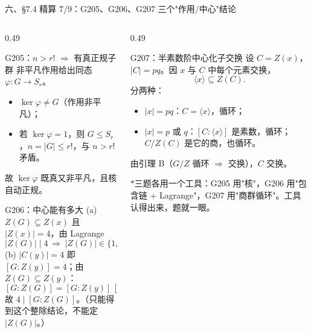 \documentclass[aspectratio=169,10pt,fontset=none]{ctexbeamer}
\newcommand{\starpt}{\textcolor{accent}{\bfseries$\ast$}}
\begin{document}
\begin{frame}[t]{六、\S7.4 精算 7/9：G205、G206、G207 三个"作用/中心"结论}
  \begin{columns}[T,onlytextwidth]
    \begin{column}{0.49\textwidth}
      \begin{exampleblock}{\footnotesize G205：$n>r!$ $\Rightarrow$ 有真正规子群}
        \scriptsize
        非平凡作用给出同态 $\varphi:G\to S_r$。
        \begin{itemize}\setlength{\itemsep}{0pt}
          \item $\ker\varphi\ne G$（作用非平凡）；
          \item 若 $\ker\varphi=1$，则 $G\le S_r$，$n=|G|\le r!$，与 $n>r!$ 矛盾。
        \end{itemize}
        故 $\ker\varphi$ 既真又非平凡，且核自动正规。
      \end{exampleblock}
      \begin{exampleblock}{\footnotesize G206：中心能有多大}
        \scriptsize
        (a) $Z(G)\subseteq Z(x)$ 且 $|Z(x)|=4$，由 Lagrange
        \[ |Z(G)|\mid4\ \Rightarrow\ |Z(G)|\in\{1,2,4\}. \]
        (b) $|C(y)|=4$ 即 $[G:Z(y)]=4$；由 $Z(G)\subseteq Z(y)$：
        \[ [G:Z(G)]=[G:Z(y)]\,[Z(y):Z(G)]=4\,[\cdots], \]
        故 $4\mid[G:Z(G)]$。（只能得到这个整除结论，不能定 $|Z(G)|$。）
      \end{exampleblock}
    \end{column}
    \begin{column}{0.49\textwidth}
      \begin{exampleblock}{\footnotesize G207：半素数阶中心化子交换}
        \scriptsize
        设 $C=Z(x)$，$|C|=pq$。因 $x$ 与 $C$ 中每个元素交换，
        \[ \langle x\rangle\subseteq Z(C). \]
        分两种：
        \begin{itemize}\setlength{\itemsep}{0pt}
          \item $|x|=pq$：$C=\langle x\rangle$，循环；
          \item $|x|=p$ 或 $q$：$[C:\langle x\rangle]$ 是素数，循环；$C/Z(C)$ 是它的商，也循环。
        \end{itemize}
        由引理 B（$G/Z$ 循环 $\Rightarrow$ 交换），$C$ 交换。
      \end{exampleblock}
      \footnotesize\color{ink!80}
      \starpt 三题各用一个工具：G205 用"核"，G206 用"包含链 + Lagrange"，G207 用"商群循环"。工具认得出来，题就一眼。
    \end{column}
  \end{columns}
\end{frame}
\end{document}

